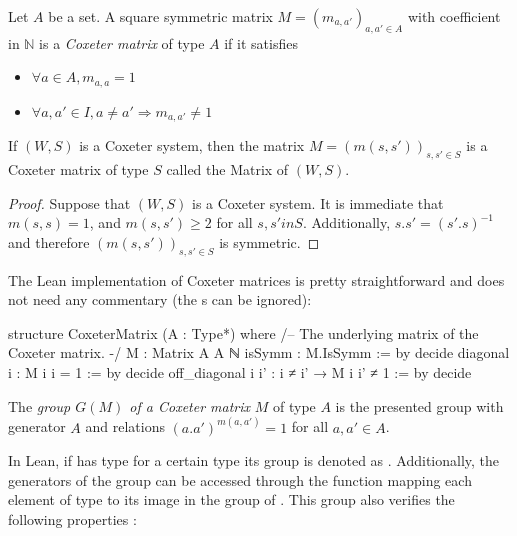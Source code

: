 \begin{definition}
    Let $A$ be a set. A square symmetric matrix $M = \left( m_{a,a'}\right)_{a,a' \in A}$ with coefficient in $\mathbb{N}$ is a \emph{Coxeter matrix} of type $A$ if it satisfies 
\begin{itemize}
    \item $\forall  a \in A, m_{a,a} = 1$
    \item $\forall a,a' \in  I, a \neq  a' \Rightarrow m_{a,a'} \neq 1$
\end{itemize}
 
    If $\left( W,S \right)$ is a Coxeter system, then the matrix $M = \left( m\left( s,s' \right) \right)_{s,s' \in  S}$ is a Coxeter matrix of type $S$ called the Matrix of $\left( W,S \right)$.
\end{definition}

\begin{proof}
    Suppose that $\left( W,S \right)$ is a Coxeter system. It is immediate that $m\left( s,s \right) = 1$, and $m(s,s') \ge  2$ for all $s,s' in S$. Additionally, $s.s' = (s'.s)^{-1}$ and therefore $\left( m\left( s,s' \right) \right)_{s,s' \in  S}$ is symmetric.
\end{proof}

The Lean implementation of Coxeter matrices is pretty straightforward and does not need any commentary (the s can be ignored):
\begin{leancode}
structure CoxeterMatrix (A : Type*) where
  /-- The underlying matrix of the Coxeter matrix. -/
  M : Matrix A A ℕ
  isSymm : M.IsSymm := by decide
  diagonal i : M i i = 1 := by decide
  off_diagonal i i' : i ≠ i' → M i i' ≠ 1 := by decide
\end{leancode}

\begin{definition}
    The \emph{group  $G(M)$ of a Coxeter matrix} $M$ of type $A$ is the presented group with generator $A$ and relations $(a.a')^{m\left( a,a' \right)} = 1$ for all $a,a' \in A$. 
\end{definition}

In Lean, if  has type  for a certain type  its group is denoted as . Additionally, the generators of the group  can be accessed through the function  mapping each element of type  to its image in the group of . This group also verifies the following properties :

